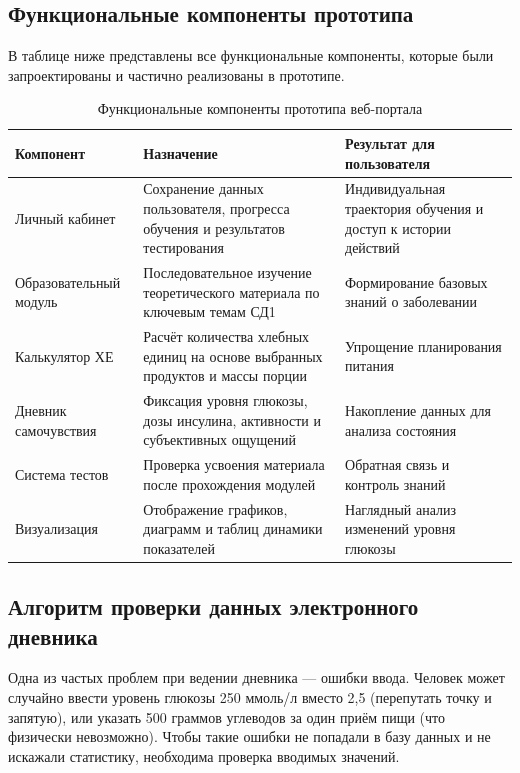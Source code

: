 \documentclass[14pt, a4paper]{extarticle}
\begin{document}
\subsection{Функциональные компоненты прототипа}

\noindent В таблице ниже представлены все функциональные компоненты, которые были запроектированы и частично реализованы в прототипе.

\begin{longtable}{|p{}|p{}|p{}|}
\caption{Функциональные компоненты прототипа веб-портала}\\
\hline
\textbf{Компонент} & \textbf{Назначение} & \textbf{Результат для пользователя} \\
\hline
Личный кабинет & Сохранение данных пользователя, прогресса обучения и результатов тестирования & Индивидуальная траектория обучения и доступ к истории действий \\
\hline
Образовательный модуль & Последовательное изучение теоретического материала по ключевым темам СД1 & Формирование базовых знаний о заболевании \\
\hline
Калькулятор ХЕ & Расчёт количества хлебных единиц на основе выбранных продуктов и массы порции & Упрощение планирования питания \\
\hline
Дневник самочувствия & Фиксация уровня глюкозы, дозы инсулина, активности и субъективных ощущений & Накопление данных для анализа состояния \\
\hline
Система тестов & Проверка усвоения материала после прохождения модулей & Обратная связь и контроль знаний \\
\hline
Визуализация & Отображение графиков, диаграмм и таблиц динамики показателей & Наглядный анализ изменений уровня глюкозы \\
\hline
\end{longtable}
\vskip 5cm
\subsection{Алгоритм проверки данных электронного дневника}

\noindent Одна из частых проблем при ведении дневника — ошибки ввода. Человек может случайно ввести уровень глюкозы 250 ммоль/л вместо 2,5 (перепутать точку и запятую), или указать 500 граммов углеводов за один приём пищи (что физически невозможно). Чтобы такие ошибки не попадали в базу данных и не искажали статистику, необходима проверка вводимых значений.
\end{document}
